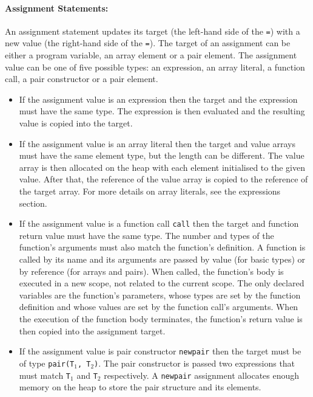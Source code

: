 \documentclass[a4paper]{article}
\theoremstyle{definition}
\newtheorem{question}{Gap}
\newcommand{\fillgap}[2]{
  \begin{center}
  \fbox{
    \begin{minipage}{4in}
      \begin{question}
        {\it #1} \hfill ({\bf #2})
      \end{question}
    \end{minipage}
  }
\end{center}
}
\begin{document}
\fillgap{\hl{Complete the above paragraph}}{5 marks}

\paragraph{Assignment Statements:}
An assignment statement updates its target (the left-hand side of the \texttt{=}) with a new value (the right-hand side of the \texttt{=}).
The target of an assignment can be either a program variable, an array element or a pair element.
The assignment value can be one of five possible types: an expression, an array literal, a function call, a pair constructor or a pair element.
\begin{itemize}
 \item If the assignment value is an expression  then
       the target and the expression must have the same type.
       The expression is then evaluated and the resulting value is copied into the target.
 \item If the assignment value is an array literal  then the target and value arrays must have the same element type,
       but the length can be different.
       The value array is then allocated on the heap with each element initialised to the given value. After that, the reference of the value array is copied to the reference of the target array.
       For more details on array literals, see the expressions section.
 \item If the assignment value is a function call \texttt{call} then the target and function return value must have the same type.
       The number and types of the function's arguments must also match the function's definition.
       A function is called by its name and its arguments are passed by value (for basic types) or by reference (for arrays and pairs).
       When called, the function's body is executed in a new scope, not related to the current scope.
       The only declared variables are the function's parameters, whose types are set by the function definition and whose values are set by the function call's arguments.
       When the execution of the function body terminates, the function's return value is then copied into the assignment target.
 \item If the assignment value is pair constructor \texttt{newpair} then the target must be of type \texttt{pair(T$_1$, T$_2$)}.
       The pair constructor is passed two expressions that must match {\tt T}$_1$ and {\tt T}$_2$ respectively.
       A \texttt{newpair} assignment allocates enough memory on the heap to store the pair structure and its elements.

\end{itemize}
\end{document}
